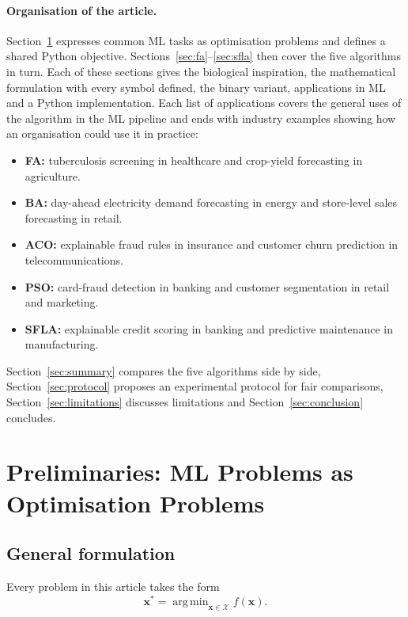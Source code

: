 \documentclass[11pt,a4paper]{article}
\DeclareMathOperator*{\argmin}{arg\,min}
\newcommand{\vect}[1]{\mathbf{#1}}
\begin{document}
\paragraph{Organisation of the article.} Section~\ref{sec:prelim} expresses common ML tasks as optimisation problems and defines a shared Python objective. Sections~\ref{sec:fa}--\ref{sec:sfla} then cover the five algorithms in turn. Each of these sections gives the biological inspiration, the mathematical formulation with every symbol defined, the binary variant, applications in ML and a Python implementation. Each list of applications covers the general uses of the algorithm in the ML pipeline and ends with industry examples showing how an organisation could use it in practice:
\begin{itemize}
  \item \textbf{FA:} tuberculosis screening in healthcare and crop-yield forecasting in agriculture.
  \item \textbf{BA:} day-ahead electricity demand forecasting in energy and store-level sales forecasting in retail.
  \item \textbf{ACO:} explainable fraud rules in insurance and customer churn prediction in telecommunications.
  \item \textbf{PSO:} card-fraud detection in banking and customer segmentation in retail and marketing.
  \item \textbf{SFLA:} explainable credit scoring in banking and predictive maintenance in manufacturing.
\end{itemize}
Section~\ref{sec:summary} compares the five algorithms side by side, Section~\ref{sec:protocol} proposes an experimental protocol for fair comparisons, Section~\ref{sec:limitations} discusses limitations and Section~\ref{sec:conclusion} concludes.

\section{Preliminaries: ML Problems as Optimisation Problems}
\label{sec:prelim}

\subsection{General formulation}

Every problem in this article takes the form
\begin{equation}
  \vect{x}^{*} = \argmin_{\vect{x} \in \mathcal{X}} f(\vect{x}).
\end{equation}
\end{document}
